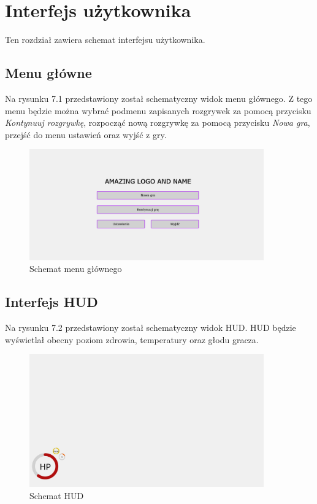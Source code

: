 \chapter{Interfejs użytkownika} 

Ten rozdział zawiera schemat interfejsu użytkownika.

\section{Menu główne}

Na rysunku 7.1 przedstawiony został schematyczny widok menu głównego. 
Z tego menu będzie można wybrać podmenu zapisanych rozgrywek za pomocą przycisku \textit{Kontynuuj rozgrywkę}, rozpocząć nową rozgrywkę za pomocą przycisku \textit{Nowa gra}, przejść do menu ustawień oraz wyjść z gry.

\begin{figure}[H]
    \centering
        \includegraphics[width=0.9\textwidth]{Graphics/interface/main_menu.png}
        \caption{Schemat menu głównego}
\end{figure}

\section{Interfejs HUD}

Na rysunku 7.2 przedstawiony został schematyczny widok HUD.
HUD będzie wyświetlał obecny poziom zdrowia, temperatury oraz głodu gracza.

\begin{figure}[H]
    \centering
        \includegraphics[width=0.9\textwidth]{Graphics/interface/HUD.png}
        \caption{Schemat HUD}
\end{figure}

